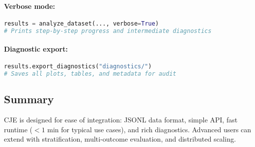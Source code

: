 \paragraph{Verbose mode:}
\begin{lstlisting}[language=Python]
results = analyze_dataset(..., verbose=True)
# Prints step-by-step progress and intermediate diagnostics
\end{lstlisting}

\paragraph{Diagnostic export:}
\begin{lstlisting}[language=Python]
results.export_diagnostics("diagnostics/")
# Saves all plots, tables, and metadata for audit
\end{lstlisting}

\subsection{Summary}

CJE is designed for ease of integration: JSONL data format, simple API, fast runtime ($< 1$ min for typical use cases), and rich diagnostics. Advanced users can extend with stratification, multi-outcome evaluation, and distributed scaling.
